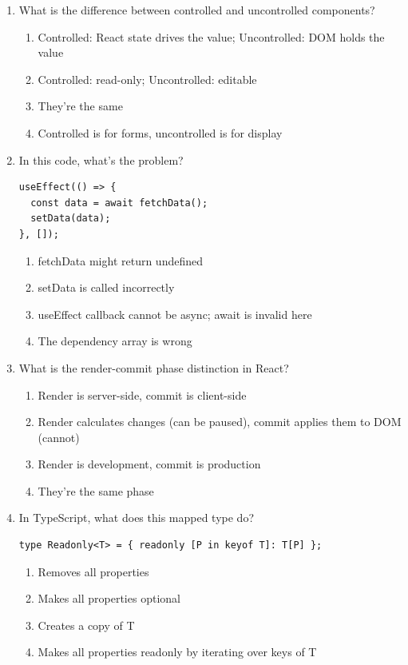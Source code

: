\documentclass[12pt,a4paper]{article}
\begin{document}
\begin{enumerate}
\item What is the difference between controlled and uncontrolled components?
\begin{enumerate}[label=\Alph*)]
    \item Controlled: React state drives the value; Uncontrolled: DOM holds the value
    \item Controlled: read-only; Uncontrolled: editable
    \item They're the same
    \item Controlled is for forms, uncontrolled is for display
\end{enumerate}

\item In this code, what's the problem?
\begin{verbatim}
useEffect(() => {
  const data = await fetchData();
  setData(data);
}, []);
\end{verbatim}
\begin{enumerate}[label=\Alph*)]
    \item fetchData might return undefined
    \item setData is called incorrectly
    \item useEffect callback cannot be async; await is invalid here
    \item The dependency array is wrong
\end{enumerate}

\item What is the render-commit phase distinction in React?
\begin{enumerate}[label=\Alph*)]
    \item Render is server-side, commit is client-side
    \item Render calculates changes (can be paused), commit applies them to DOM (cannot)
    \item Render is development, commit is production
    \item They're the same phase
\end{enumerate}

\item In TypeScript, what does this mapped type do?
\begin{verbatim}
type Readonly<T> = { readonly [P in keyof T]: T[P] };
\end{verbatim}
\begin{enumerate}[label=\Alph*)]
    \item Removes all properties
    \item Makes all properties optional
    \item Creates a copy of T
    \item Makes all properties readonly by iterating over keys of T
\end{enumerate}


\end{enumerate}
\end{document}
